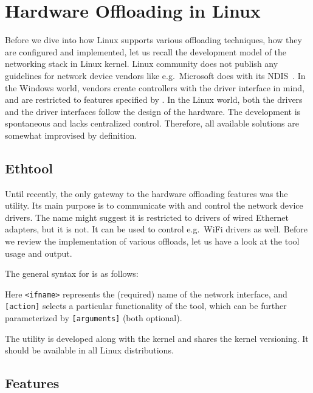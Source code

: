 \chapter{Hardware Offloading in Linux}
\label{chap:linux}

Before we dive into how Linux supports various offloading techniques, how they
are configured and implemented, let us recall the development
model of the networking stack in Linux kernel. Linux
community does not publish any guidelines for network device vendors like
e.g.\ Microsoft does with its \acrfull{NDIS}~\cite{NDIS}. In the Windows world,
vendors create controllers with the driver interface in mind, and are
restricted to features specified by . In the Linux world, both the
drivers and the driver interfaces follow the design of the hardware. The
development is spontaneous and lacks centralized control. Therefore, all available
solutions are somewhat improvised by definition.

\section{Ethtool}

Until recently, the only gateway to the hardware offloading features was the
 utility. Its main purpose is to communicate with and
control the network device drivers. The name might suggest it is restricted to
drivers of wired Ethernet adapters, but it is not. It can be used to control e.g.\ WiFi
drivers as well. Before we review the implementation of various offloads, let
us have a look at the tool usage and output.

The general syntax for  is as follows:


Here \texttt{<ifname>} represents the (required) name of the network
interface, and \texttt{[action]} selects a particular functionality of the
tool, which can be further parameterized by \texttt{[arguments]} (both
optional).

The utility is developed along with the kernel and shares the kernel
versioning. It should be available in all Linux distributions.

\section{Features}

